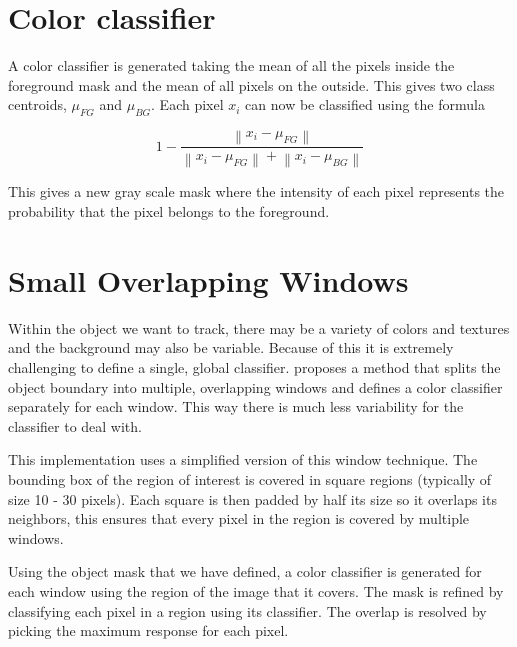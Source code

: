\documentclass[12pt]{article}
\newcommand{\norm}[1]{\left\lVert#1\right\rVert}
\begin{document}
\section{Color classifier}

A color classifier is generated taking the mean of all the pixels inside the foreground mask and the mean of all pixels on the outside. This gives two class centroids, $\mu_{FG}$ and $\mu_{BG}$. Each pixel $x_i$ can now be classified using the formula 

\[
1 - \frac{\norm{x_i - \mu_{FG}}}{\norm{x_i - \mu_{FG}}+\norm{x_i - \mu_{BG}}}
\]

This gives a new gray scale mask where the intensity of each pixel represents the probability that the pixel belongs to the foreground.

\section{Small Overlapping Windows}

Within the object we want to track, there may be a variety of colors and textures and the background may also be variable. Because of this it is extremely challenging to define a single, global classifier. \cite{snapcut} proposes a method that splits the object boundary into multiple, overlapping windows and defines a color classifier separately for each window. This way there is much less variability for the classifier to deal with.

This implementation uses a simplified version of this window technique. The bounding box of the region of interest is covered in square regions (typically of size 10 - 30 pixels). Each square is then padded by half its size so it overlaps its neighbors, this ensures that every pixel in the region is covered by multiple windows.

Using the object mask that we have defined, a color classifier is generated for each window using the region of the image that it covers. The mask is refined by classifying each pixel in a region using its classifier. The overlap is resolved by picking the maximum response for each pixel.
\end{document}
